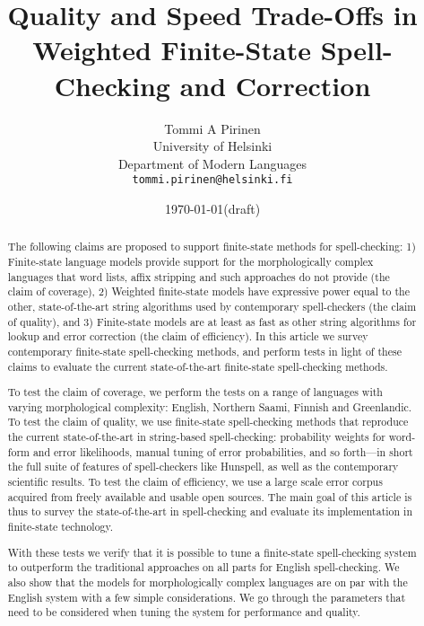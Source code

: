 \documentclass[a4paper,12pt]{article}
\title{Quality and Speed Trade-Offs in
    Weighted Finite-State Spell-Checking and Correction}
\author{Tommi A Pirinen\\
 [0.5cm] University of Helsinki\\ %
 Department of Modern Languages\\ %
 \texttt{tommi.pirinen@helsinki.fi}}   %
\date{\today (draft)}
\begin{document}
\maketitle
\thispagestyle{empty}

\begin{abstract} \noindent The following claims are proposed to support
    finite-state methods for spell-checking: 1) Finite-state language models
    provide support for the morphologically complex languages that word lists,
    affix stripping and such approaches do not provide (the claim of coverage),
    2) Weighted finite-state models have expressive power equal to the other,
    state-of-the-art string algorithms used by contemporary spell-checkers (the
    claim of quality), and 3) Finite-state models are at least as fast as other
    string algorithms for lookup and error correction (the claim of
    efficiency).  In this article we survey contemporary finite-state
    spell-checking methods, and perform tests in light of these claims to
    evaluate the current state-of-the-art finite-state spell-checking methods.

    To test the claim of coverage, we perform the tests on a range of languages
    with varying morphological complexity: English, Northern Saami, Finnish and
    Greenlandic.  To test the claim of quality, we use finite-state
    spell-checking methods that reproduce the current state-of-the-art in
    string-based spell-checking: probability weights for word-form and error
    likelihoods, manual tuning of error probabilities, and so forth---in short
    the full suite of features of spell-checkers like Hunspell, as well as the
    contemporary scientific results. To test the claim of efficiency, we use a
    large scale error corpus acquired from freely available and usable open
    sources. The main goal of this article is thus to survey the
    state-of-the-art in spell-checking and evaluate its implementation in
    finite-state technology.  

    With these tests we verify that it is possible to tune a finite-state
    spell-checking system to outperform the traditional approaches on all parts
    for English spell-checking. We also show that the models for
    morphologically complex languages are on par with the English system with a
    few simple considerations. We go through the parameters that need to
    be considered when tuning the system for performance and quality.

\end{abstract}
\end{document}
